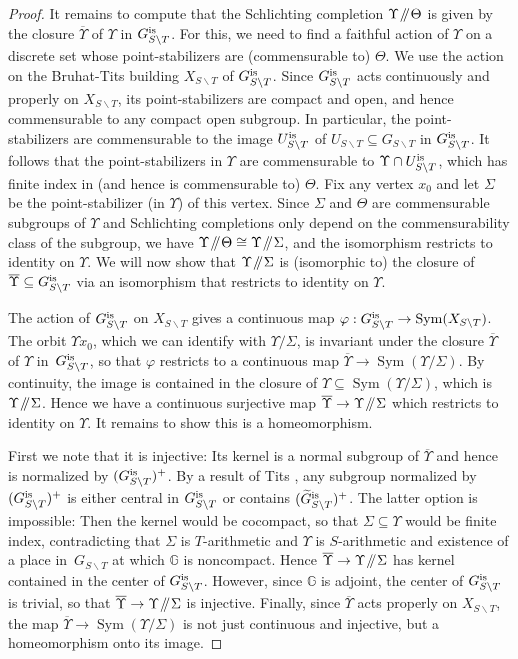 \documentclass[JEP,XML,SOM,Unicode,published]{cedram}
\newcommand{\Y}{\ensuremath{\Upsilon}}
\let\bs\backslash
\newcommand{\sslash}{\mathbin{\mkern-3mu /\mkern-5mu/ \mkern-3mu}}
\newcommand{\bbG}{\ensuremath{\mathbb{G}}}
\DeclareMathOperator{\Sym}{Sym}
\theoremstyle{definition}
\begin{document}
\begin{proof}
It remains to compute that the Schlichting completion $\Y\sslash\Theta$ is given by the closure $\overline{\Y}$ of $\Y$ in $G_{S\bs T}^{\textup{is}}$. For this, we need to find a faithful action of $\Y$ on a discrete set whose point-stabilizers are (commensurable to) $\Theta$. We use the action on the Bruhat-Tits building $X_{S\bs T}$ of $G_{S\bs T}^{\textup{is}}$. Since $G_{S\bs T}^{\textup{is}}$ acts continuously and properly on $X_{S\bs T}$, its point-stabilizers are compact and open, and hence commensurable to any compact open subgroup. In particular, the point-stabilizers are commensurable to the image $U_{S\bs T}^{\textup{is}}$ of $U_{S\bs T}\subseteq G_{S\bs T}$ in $G_{S\bs T}^{\textup{is}}$. It follows that the point-stabilizers in $\Y$ are commensurable to $\Y\cap U_{S\bs T}^{\textup{is}}$, which has finite index in (and hence is commensurable to) $\Theta$. Fix any vertex $x_0$ and let $\Sigma$ be the point-stabilizer (in $\Y$) of this vertex. Since $\Sigma$ and $\Theta$ are commensurable subgroups of $\Y$ and Schlichting completions only depend on the commensurability class of the subgroup, we have $\Y\sslash\Theta\cong \Y\sslash\Sigma$, and the isomorphism restricts to identity on $\Y$. We will now show that $\Y\sslash\Sigma$ is (isomorphic to) the closure of $\overline{\Y}\subseteq G_{S\bs T}^{\textup{is}}$ via an isomorphism that restricts to identity on $\Y$.

The action of $G_{S\bs T}^{\textup{is}}$ on $X_{S\bs T}$ gives a continuous map $\varphi:G_{S\bs T}^{\textup{is}}\to \Sym(X_{S\bs T})$. The orbit $\Y x_0$, which we can identify with $\Y/\Sigma$, is invariant under the closure $\overline{\Y}$ of $\Y$ in~$G_{S\bs T}^{\textup{is}}$, so that $\varphi$ restricts to a continuous map $\overline{\Y}\to \Sym(\Y/\Sigma)$. By continuity, the image is contained in the closure of $\Y\subseteq\Sym(\Y/\Sigma)$, which is $\Y\sslash\Sigma$. Hence we have a continuous surjective map $\overline{\Y}\to\Y\sslash\Sigma$ which restricts to identity on $\Y$. It remains to show this is a homeomorphism.

First we note that it is injective: Its kernel is a normal subgroup of $\overline{\Y}$ and hence is normalized by $(G_{S\bs T}^{\textup{is}})^+$. By a result of Tits \cite{tits-simple}, any subgroup normalized by $(G_{S\bs T}^{\textup{is}})^+$ is either central in $G_{S\bs T}^{\textup{is}}$ or contains $(\widetilde{G}_{S\bs T}^{\textup{is}})^+$. The latter option is impossible: Then the kernel would be cocompact, so that $\Sigma\subseteq\Y$ would be finite index, contradicting that $\Sigma$ is $T$-arithmetic and $\Y$ is $S$-arithmetic and existence of a place in~$G_{S\bs T}$ at which $\bbG$ is noncompact. Hence $\overline{\Y}\to\Y\sslash\Sigma$ has kernel contained in the center of $G_{S\bs T}^{\textup{is}}$. However, since $\bbG$ is adjoint, the center of $G_{S\bs T}^{\textup{is}}$ is trivial, so that $\overline{\Y}\to\Y\sslash\Sigma$ is injective. Finally, since $\overline{\Y}$ acts properly on $X_{S\bs T}$, the map $\overline{\Y}\to \Sym(\Y / \Sigma)$ is not just continuous and injective, but a homeomorphism onto its image. \end{proof}
\end{document}
